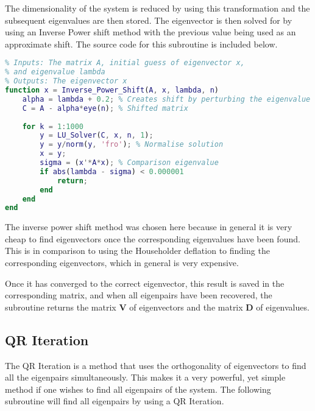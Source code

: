 \documentclass[11pt,oneside]{article}
\begin{document}
The dimensionality of the system is reduced by using this transformation and the subsequent eigenvalues are then stored. The eigenvector is then solved for by using an Inverse Power shift method with the previous value being used as an approximate shift. The source code for this subroutine is included below.

\begin{lstlisting}[language=Matlab]
%% Function to calculate eigenvectors
% Inputs: The matrix A, initial guess of eigenvector x, 
% and eigenvalue lambda
% Outputs: The eigenvector x
function x = Inverse_Power_Shift(A, x, lambda, n)
    alpha = lambda + 0.2; % Creates shift by perturbing the eigenvalue
    C = A - alpha*eye(n); % Shifted matrix
    
    for k = 1:1000
        y = LU_Solver(C, x, n, 1);
        y = y/norm(y, 'fro'); % Normalise solution
        x = y;
        sigma = (x'*A*x); % Comparison eigenvalue
        if abs(lambda - sigma) < 0.000001 
            return;
        end
    end
end
\end{lstlisting}

The inverse power shift method was chosen here because in general it is very cheap to find eigenvectors once the corresponding eigenvalues have been found. This is in comparison to using the Householder deflation to finding the corresponding eigenvectors, which in general is very expensive.

Once it has converged to the correct eigenvector, this result is saved in the corresponding matrix, and when all eigenpairs have been recovered, the subroutine returns the matrix \textbf{V} of eigenvectors and the matrix \textbf{D} of eigenvalues.

\subsection*{QR Iteration}

The QR Iteration is a method that uses the orthogonality of eigenvectors to find all the eigenpairs simultaneously. This makes it a very powerful, yet simple method if one wishes to find all eigenpairs of the system. The following subroutine will find all eigenpairs by using a QR Iteration. 
\end{document}
